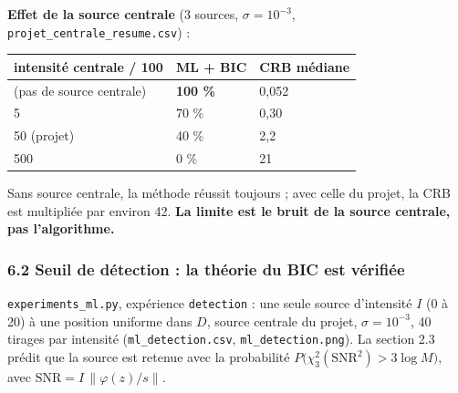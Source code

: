 \documentclass[
  french,
]{article}
\newcounter{none} %
\begin{document}
\textbf{Effet de la source centrale} (3 sources, \(\sigma = 10^{-3}\),
\texttt{projet\_centrale\_resume.csv}) :

{\def\LTcaptype{none} %
\begin{longtable}[]{@{}lll@{}}
\toprule\noalign{}
intensité centrale / 100 & ML + BIC & CRB médiane \\
\midrule\noalign{}
\endhead
\bottomrule\noalign{}
\endlastfoot
0 (pas de source centrale) & \textbf{100 \%} & 0,052 \\
5 & 70 \% & 0,30 \\
50 (projet) & 40 \% & 2,2 \\
500 & 0 \% & 21 \\
\end{longtable}
}

Sans source centrale, la méthode réussit toujours ; avec celle du
projet, la CRB est multipliée par environ 42. \textbf{La limite est le
bruit de la source centrale, pas l'algorithme.}

\subsubsection{6.2 Seuil de détection : la théorie du BIC est
vérifiée}\label{seuil-de-duxe9tection-la-thuxe9orie-du-bic-est-vuxe9rifiuxe9e}

\texttt{experiments\_ml.py}, expérience \texttt{detection} : une seule
source d'intensité \(I\) (0 à 20) à une position uniforme dans \(D\),
source centrale du projet, \(\sigma = 10^{-3}\), 40 tirages par
intensité (\texttt{ml\_detection.csv}, \texttt{ml\_detection.png}). La
section 2.3 prédit que la source est retenue avec la probabilité
\(P\big(\chi^2_3(\mathrm{SNR}^2) > 3\log M\big)\), avec
\(\mathrm{SNR} = I\,\lVert\varphi(z)/s\rVert\).
\end{document}
